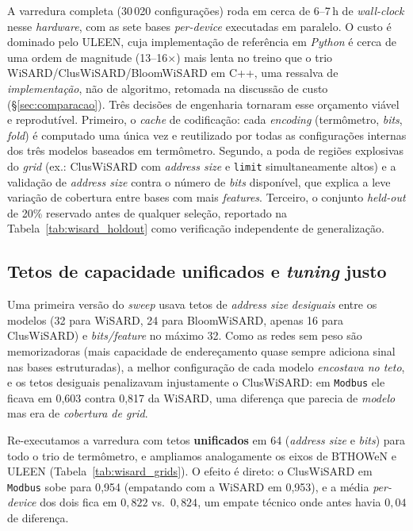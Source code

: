 A varredura completa (30\,020 configurações) roda em cerca de 6--7\,h
de \emph{wall-clock} nesse \emph{hardware}, com as sete bases
\emph{per-device} executadas em paralelo. O custo é dominado pelo
ULEEN, cuja implementação de referência em \emph{Python} é cerca de
uma ordem de magnitude (13--16$\times$) mais lenta no treino que o trio
WiSARD/ClusWiSARD/BloomWiSARD em C++, uma ressalva de
\emph{implementação}, não de algoritmo, retomada na discussão de custo
(\S{}\ref{sec:comparacao}).
Três decisões de engenharia tornaram esse orçamento viável e
reprodutível. Primeiro, o \emph{cache} de codificação: cada
\emph{encoding} (termômetro, \emph{bits}, \emph{fold}) é computado uma
única vez e reutilizado por todas as configurações internas dos três
modelos baseados em termômetro. Segundo, a poda de regiões explosivas
do \emph{grid} (ex.: ClusWiSARD com \emph{address size} e
\texttt{limit} simultaneamente altos) e a validação de
\emph{address size} contra o número de \emph{bits} disponível, que
explica a leve variação de cobertura entre bases com mais
\emph{features}. Terceiro, o conjunto \emph{held-out} de 20\% reservado
antes de qualquer seleção, reportado na Tabela~\ref{tab:wisard_holdout}
como verificação independente de generalização.

\subsection{Tetos de capacidade unificados e \emph{tuning} justo}
\label{sec:wisard_fair}

Uma primeira versão do \emph{sweep} usava tetos de \emph{address size}
\emph{desiguais} entre os modelos (32 para WiSARD, 24 para BloomWiSARD,
apenas 16 para ClusWiSARD) e \emph{bits/feature} no máximo 32. Como as
redes sem peso são memorizadoras (mais capacidade de endereçamento
quase sempre adiciona sinal nas bases estruturadas), a melhor
configuração de cada modelo \emph{encostava no teto}, e os tetos
desiguais penalizavam injustamente o ClusWiSARD: em \texttt{Modbus} ele
ficava em 0{,}603 contra 0{,}817 da WiSARD, uma diferença que parecia
de \emph{modelo} mas era de \emph{cobertura de grid}.

Re-executamos a varredura com tetos \textbf{unificados} em 64
(\emph{address size} e \emph{bits}) para todo o trio de termômetro, e
ampliamos analogamente os eixos de BTHOWeN e ULEEN
(Tabela~\ref{tab:wisard_grids}). O efeito é direto: o ClusWiSARD em
\texttt{Modbus} sobe para 0{,}954 (empatando com a WiSARD em 0{,}953),
e a média \emph{per-device} dos dois fica em $0{,}822$ vs.\ $0{,}824$,
um empate técnico onde antes havia $0{,}04$ de diferença.

